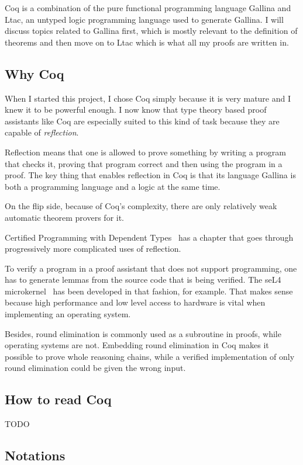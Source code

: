 \documentclass[english, 12pt, a4paper, sci, a-1b, online]{aaltothesis}
\begin{document}
Coq is a combination of the pure functional programming language Gallina and Ltac, an untyped logic programming language used to generate Gallina. I will discuss topics related to Gallina first, which is mostly relevant to the definition of theorems and then move on to Ltac which is what all my proofs are written in.

\subsection{Why Coq}

When I started this project, I chose Coq simply because it is very mature and I knew it to be powerful enough. I now know that type theory based proof assistants like Coq are especially suited to this kind of task because they are capable of \emph{reflection}.

Reflection means that one is allowed to prove something by writing a program that checks it, proving that program correct and then using the program in a proof. The key thing that enables reflection in Coq is that its language Gallina is both a programming language and a logic at the same time.

On the flip side, because of Coq's complexity, there are only relatively weak automatic theorem provers for it.

Certified Programming with Dependent Types~\cite{CPDT} has a chapter that goes through progressively more complicated uses of reflection.

To verify a program in a proof assistant that does not support programming, one has to generate lemmas from the source code that is being verified. The seL4 microkernel~\cite{sel4} has been developed in that fashion, for example. That makes sense because high performance and low level access to hardware is vital when implementing an operating system.

Besides, round elimination is commonly used as a subroutine in proofs, while operating systems are not. Embedding round elimination in Coq makes it possible to prove whole reasoning chains, while a verified implementation of only round elimination could be given the wrong input.

\subsection{How to read Coq}

TODO

\subsection{Notations}
\end{document}
